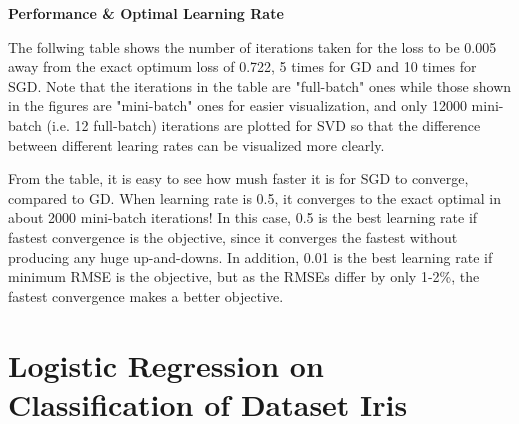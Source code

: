\documentclass{article} %
\begin{document}
\vspace{0.2cm}
\textbf{Performance \& Optimal Learning Rate}

  The follwing table shows the number of iterations taken for the loss to be 0.005 away from the exact optimum loss of 0.722, 5 times for GD and 10 times for SGD. Note that the iterations in the table are "full-batch" ones while those shown in the figures are "mini-batch" ones for easier visualization, and only 12000 mini-batch (i.e. 12 full-batch) iterations are plotted for SVD so that the difference between different learing rates can be visualized more clearly.

  From the table, it is easy to see how mush faster it is for SGD to converge, compared to GD. When learning rate is 0.5, it converges to the exact optimal in about 2000 mini-batch iterations! In this case, 0.5 is the best learning rate if fastest convergence is the objective, since it converges the fastest without producing any huge up-and-downs. In addition, 0.01 is the best learning rate if minimum RMSE is the objective, but as the RMSEs differ by only 1-2\%, the fastest convergence makes a better objective.

  \begin{table}[!h]
  \centering
  \caption{Iteration and RMSE performance with different learning rates}
  \end{table}


\vspace{0.3cm}
\section*{Logistic Regression on Classification of Dataset Iris} %
\end{document}

